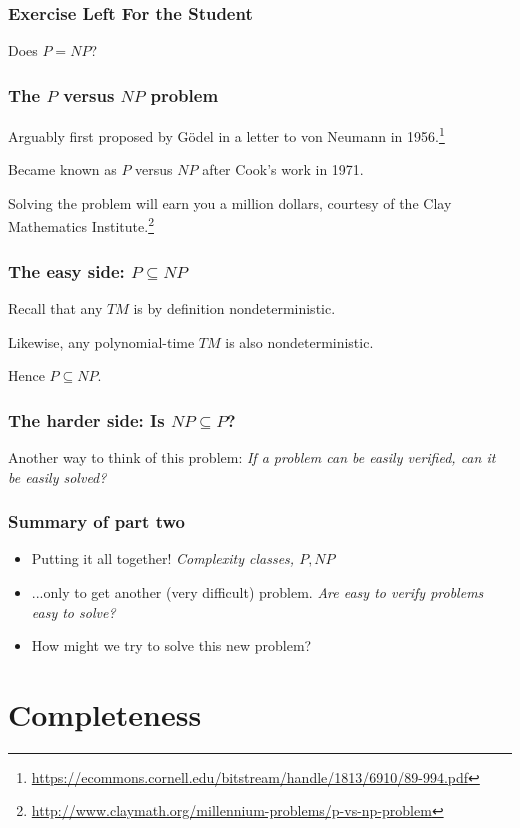 \documentclass[aspectratio=169]{beamer}
\begin{document}
\begin{frame}
\frametitle{Exercise Left For the Student}
\centerline{Does $P=NP$?}
\end{frame}

\begin{frame}
\frametitle{The $P$ versus $NP$ problem}
Arguably first proposed by G\"{o}del in a letter to von Neumann in 1956.\footnote{\url{https://ecommons.cornell.edu/bitstream/handle/1813/6910/89-994.pdf}}

Became known as $P$ versus $NP$ after Cook's work in 1971.

Solving the problem will earn you a million dollars, courtesy of the Clay Mathematics Institute.\footnote{\url{http://www.claymath.org/millennium-problems/p-vs-np-problem}}
\end{frame}

\begin{frame}
\frametitle{The easy side: $P \subseteq NP$}

Recall that any $TM$ is by definition nondeterministic.

Likewise, any polynomial-time $TM$ is also nondeterministic.

Hence $P \subseteq NP$.
\end{frame}

\begin{frame}
\frametitle{The harder side: Is $NP \subseteq P$?}

Another way to think of this problem: {\em If a problem can be easily verified, can it be easily solved?}
\end{frame}

\begin{frame}
\frametitle{Summary of part two}
\begin{itemize}
    \item Putting it all together! {\em Complexity classes, $P, NP$}
    \item ...only to get another (very difficult) problem. {\em Are easy to verify problems easy to solve?}
    \item How might we try to solve this new problem?
\end{itemize}
\end{frame}

\section{Completeness}
\end{document}
